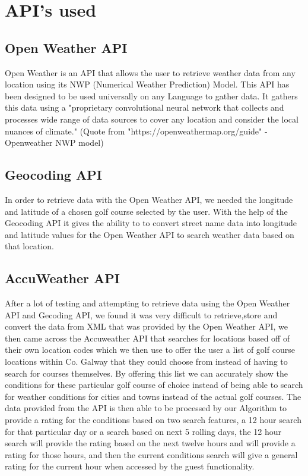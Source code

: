 \section{API's used}

\subsection{Open Weather API}
Open Weather is an API that allows the user to retrieve weather data from any location using its NWP (Numerical Weather Prediction) Model. This API has been designed to be used universally on any Language to gather data. It gathers this data using a "proprietary convolutional neural network that collects and processes wide range of data sources to cover any location and consider the local nuances of climate." (Quote from "https://openweathermap.org/guide" - Openweather NWP model)

\subsection{Geocoding API}
In order to retrieve data with the Open Weather API, we needed the longitude and latitude of a chosen golf course selected by the user. With the help of the Geocoding API it gives the ability to to convert street name data into longitude and latitude values for the Open Weather API to search weather data based on that location.

\subsection{AccuWeather API}
After a lot of testing and attempting to retrieve data using the Open Weather API and Gecoding API, we found it was very difficult to retrieve,store and convert the data from XML that was provided by the Open Weather API, we then came across the Accuweather API that searches for locations based off of their own location codes which we then use to offer the user a list of golf course locations within Co. Galway that they could choose from instead of having to search for courses themselves.
\newline
\newline
By offering this list we can accurately show the conditions for these particular golf course of choice instead of being able to search for weather conditions for cities and towns instead of the actual golf courses.
\newline
\newline
The data provided from the API is then able to be processed by our Algorithm to provide a rating for the conditions based on two search features, a 12 hour search for that particular day or a search based on next 5 rolling days, the 12 hour search will provide the rating based on the next twelve hours and will provide a rating for those hours, and then the current conditions search will give a general rating for the current hour when accessed by the guest functionality.

